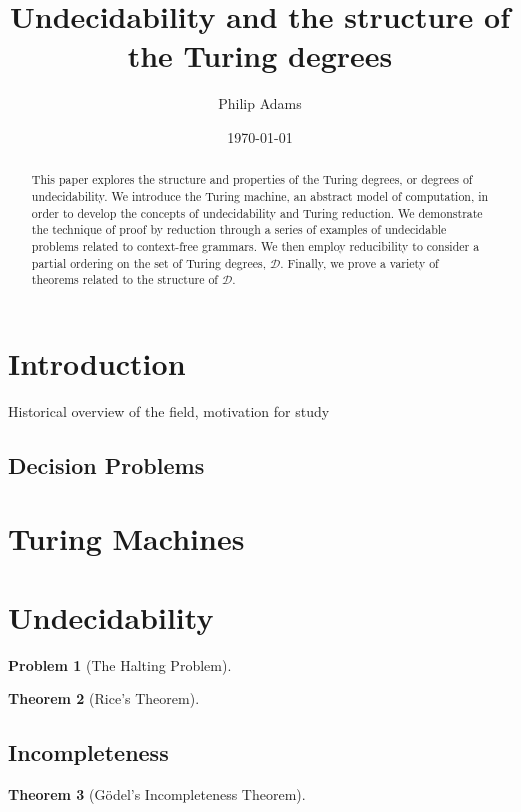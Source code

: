 \documentclass[psamsfonts]{amsart}
\title{Undecidability and the structure of the Turing degrees}
\author{Philip Adams}
\date{\today}
\newtheorem{thm}{Theorem}[section]
\newtheorem{prob}[thm]{Problem}
\theoremstyle{definition}
\theoremstyle{remark}
\numberwithin{equation}{section}
\begin{document}
\begin{abstract}

  This paper explores the structure and properties of the Turing degrees, or
  degrees of undecidability. We introduce the Turing machine, an abstract model
  of computation, in order to develop the concepts of undecidability and Turing
  reduction. We demonstrate the technique of proof by reduction through a series
  of examples of undecidable problems related to context-free grammars. We then
  employ reducibility to consider a partial ordering on the set of Turing degrees, $\mathcal{D}$. Finally, we prove a variety of theorems
  related to the structure of $\mathcal{D}$.
  
\end{abstract}

\maketitle


\tableofcontents

\section{Introduction}
Historical overview of the field, motivation for study
\cite{ambos-spies06:_degrees_unsol}
\cite{soare16_turin_comput}
\cite{soare1999history}
\cite{lerman16:_degrees_unsol}
\subsection{Decision Problems}


\section{Turing Machines}
\cite{turing37_comput_number_with_applic_to_entsc}
\section{Undecidability}


\begin{prob}[The Halting Problem]
  \label{prob:halting}
  \cite{turing37_comput_number_with_applic_to_entsc}
  \cite{sipser13:_introd_theor_comput}
\end{prob}
\begin{thm}[Rice's Theorem] \cite{kozen99_autom}
\end{thm}
\subsection{Incompleteness}
\begin{thm}[G\"odel's Incompleteness Theorem] 
  \cite{kleene43_recur_predic_quant}
\end{thm}
\end{document}
